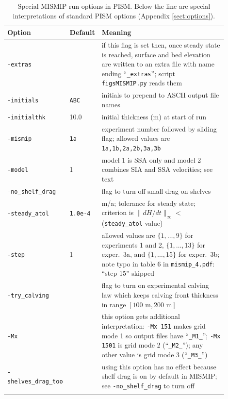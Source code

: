 \documentclass[11pt,final]{amsart}
\begin{document}
\begin{table}[ht]
\caption{Special MISMIP run options in PISM.  Below the line are special interpretations of standard PISM options (Appendix \ref{sect:options}).}\label{tab:MISMIPoptions}
\small
\begin{tabular}{p{0.15\linewidth}p{0.1\linewidth}p{0.65\linewidth}}\hline
\textbf{Option} & \textbf{Default} & \textbf{Meaning} \\ \hline
\verb|-extras| &  & if this flag is set then, once steady state is reached, surface and bed elevation are written to an extra file with name ending ``\verb|_extras|''; script \verb|figsMISMIP.py| reads them\\
\verb|-initials| & \verb|ABC| & initials to prepend to ASCII output file names \\
\verb|-initialthk| & 10.0 & initial thickness (m) at start of run \\
\verb|-mismip| & \verb|1a| & experiment number followed by sliding flag; allowed values are \verb|1a,1b,2a,2b,3a,3b| \\
\verb|-model| & 1 & model 1 is SSA only and model 2 combines SIA and SSA velocities; see text \\
\verb|-no_shelf_drag| &  & flag to turn off small drag on shelves \\
\verb|-steady_atol| & \verb|1.0e-4| & m/a; tolerance for steady state; criterion is  $\|dH/dt\|_\infty <$(\verb|steady_atol| value) \\
\verb|-step| & 1 & allowed values are $\{1,\dots,9\}$ for experiments 1 and 2, $\{1,\dots,13\}$ for  exper.~3a, and $\{1,\dots,15\}$ for exper.~3b; note typo in table 6 in \verb|mismip_4.pdf|: ``step 15'' skipped \\
\verb|-try_calving| &  & flag to turn on experimental calving law which keeps  calving front thickness in range $[100\text{ m},200\text{ m}]$ \\
\hline
\verb|-Mx| &  & this option gets additional interpretation: \verb|-Mx 151| makes grid  mode 1 so output files have ``\verb|_M1_|''; \verb|-Mx 1501| is grid mode 2  (``\verb|_M2_|''); any other value is grid mode 3 (``\verb|_M3_|'')\\
\verb|-shelves_drag_too| &  & using this option has no effect because shelf drag is on by default in MISMIP; see \verb|-no_shelf_drag| to turn off\\
\hline\normalsize
\end{tabular}
\end{table}
\end{document}
